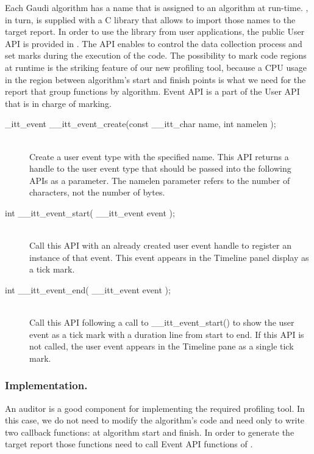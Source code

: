 \documentclass[a4paper]{jpconf}
\begin{document}
Each Gaudi algorithm has a name that is assigned to an algorithm at run-time. \amp, in turn, is supplied with 
a C library that allows to import those names to the target report. In order to use the library from user applications, 
the public User API is provided in \amp. The API enables to control the data collection process and set marks during 
the execution of the code. The possibility to mark code regions at runtime is the striking feature 
of our new profiling tool, because a CPU usage in the region between algorithm’s start and finish points is what we 
need for the report that group functions by algorithm. 
Event API is a part of the User API  that is in charge of marking.

\begin{description}
\item[\_itt\_event \_\_itt\_event\_create(const \_\_itt\_char \*name, int namelen );] \hfill \\
Create a user event type with the specified name. This API returns a handle to the user event type that should be 
passed into the following APIs as a parameter. The namelen parameter refers to the number of characters, 
not the number of bytes.

\item[int \_\_itt\_event\_start( \_\_itt\_event event );] \hfill \\
Call this API with an already created user event handle to register an instance of that event. This event appears 
in the Timeline panel display as a tick mark.

\item[int \_\_itt\_event\_end( \_\_itt\_event event );] \hfill \\
Call this API following a call to \_\_itt\_event\_start() to show the user event as a tick mark with a duration line 
from start to end. If this API is not called, the user event appears in the Timeline pane as a single tick mark.
\end{description}

\subsubsection{Implementation.}

An auditor is a good component for implementing the required profiling tool. In this case, we do not need to modify 
the algorithm’s code and need only to write two callback functions: at algorithm start and finish. In order to generate 
the target report those functions need to call Event API functions of \amp.
\end{document}
